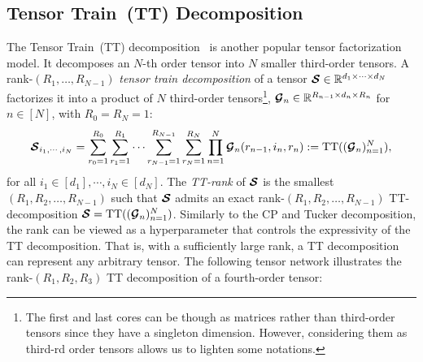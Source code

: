 \subsection{Tensor Train~(TT) Decomposition}\label{sec:tt-decomposition}
The Tensor Train~(TT) decomposition~\citep{oseledets2010approximation} is another popular tensor factorization model. It decomposes an $N$-th order tensor into $N$ smaller third-order tensors. 
A rank-$(R_1,\dots,R_{N-1})$ \textit{tensor train decomposition} of a tensor $\bm{\mathcal{S}}\in\mathbb{R}^{d_1\times\cdots\times d_N}$ factorizes it into a product of $N$  third-order tensors\footnote{The first and last cores can be though as matrices rather than third-order tensors since they have a singleton dimension. However, considering them as third-rd order tensors allows us to lighten some notations.}, $\bm{\mathcal{G}}_n\in\mathbb{R}^{R_{n-1}\times d_n\times R_n}$ for $n\in [N]$, with $R_0=R_N=1$:
$$\bm{\mathcal{S}}_{i_1,\cdots,i_N}= \sum_{r_0=1}^{R_0}\sum_{r_1=1}^{R_1} \cdots \sum_{r_{N-1}=1}^{R_{N-1}}\sum_{r_N=1}^{R_N} \prod_{n=1}^N\bm{\mathcal{G}}_n(r_{n-1},i_n,r_n) := \operatorname*{\operatorname{TT}}(({\bm{\mathcal{G}}_n})_{n=1}^N),$$ 
for all $i_1\in[d_1],\cdots,i_N\in[d_N]$.  
The \emph{TT-rank} of $\bm{\mathcal{S}}$ is the smallest
$(R_1,R_2,\dots,R_{N-1})$ such that $\bm{\mathcal{S}}$ admits an exact rank-$(R_1,R_2,\dots,R_{N-1})$ TT-decomposition $\bm{\mathcal{S}}=\operatorname*{\operatorname{TT}}(({\bm{\mathcal{G}}_n})_{n=1}^N)$.
Similarly to the CP and Tucker decomposition, the rank can be viewed as a hyperparameter that controls the expressivity of the TT decomposition. That is, with a sufficiently large rank, a TT decomposition can represent any arbitrary tensor. The following tensor network illustrates the rank-$(R_1,R_2,R_3)$ TT decomposition of a fourth-order tensor: 

